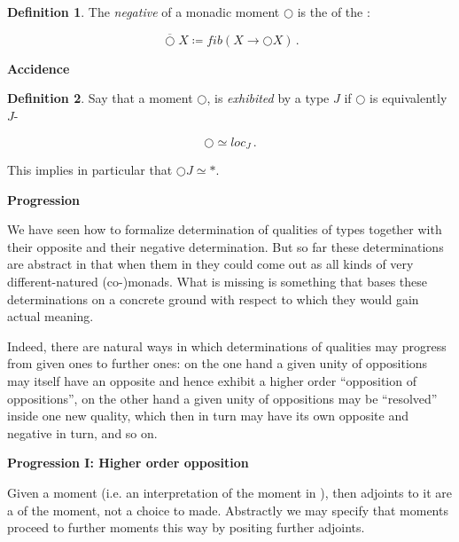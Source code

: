 \documentclass[12pt,titlepage]{article}
\theoremstyle{plain}
\theoremstyle{definition}
\newtheorem{defn}{Definition}
\theoremstyle{remark}
\begin{document}
\begin{defn}
\label{NegativeMonadicMoment}\hypertarget{NegativeMonadicMoment}{}
The \emph{negative} of a monadic moment $\bigcirc$ is the  of the :

\begin{displaymath}
\overline{\bigcirc} X \coloneqq fib(X \to \bigcirc X)
  \,.
\end{displaymath}
\end{defn}
\textbf{Accidence}

\begin{defn}
\label{Localization}\hypertarget{Localization}{}
Say that a moment $\bigcirc$, is \emph{exhibited} by a type $J$ if $\bigcirc$ is equivalently $J$-

\begin{displaymath}
\bigcirc \simeq loc_{J}
  \,.
\end{displaymath}
\end{defn}
This implies in particular that $\bigcirc J \simeq \ast$.

\textbf{Progression}

We have seen how to formalize determination of qualities of types together with their opposite and their negative determination. But so far these determinations are abstract in that when  them in  they could come out as all kinds of very different-natured (co-)monads. What is missing is something that bases these determinations on a concrete ground with respect to which they would gain actual meaning.

Indeed, there are natural ways in which determinations of qualities may progress from given ones to further ones: on the one hand a given unity of oppositions may itself have an opposite and hence exhibit a higher order ``opposition of oppositions'', on the other hand a given unity of oppositions may be ``resolved'' inside one new quality, which then in turn may have its own opposite and negative in turn, and so on.

\textbf{Progression I: Higher order opposition}

Given a  moment (i.e. an interpretation of the moment in ), then adjoints to it are a  of the moment, not a choice to made. Abstractly we may specify that moments proceed to further moments this way by positing further adjoints.
\end{document}
